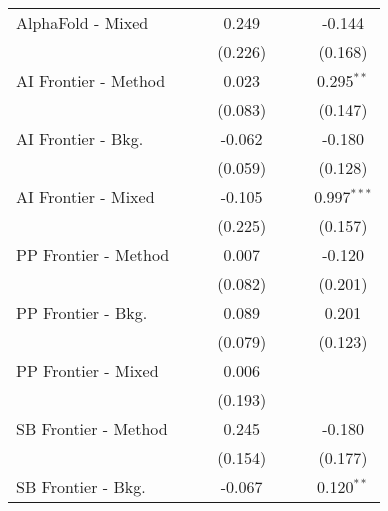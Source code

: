 \begin{tabular}{lcccccc}
   AlphaFold - Mixed    &               &              & 0.249          &               &              & -0.144\\   
                        &               &              & (0.226)        &               &              & (0.168)\\   
   AI Frontier - Method &               &              & 0.023          &               &              & 0.295$^{**}$\\   
                        &               &              & (0.083)        &               &              & (0.147)\\   
   AI Frontier - Bkg.   &               &              & -0.062         &               &              & -0.180\\   
                        &               &              & (0.059)        &               &              & (0.128)\\   
   AI Frontier - Mixed  &               &              & -0.105         &               &              & 0.997$^{***}$\\   
                        &               &              & (0.225)        &               &              & (0.157)\\   
   PP Frontier - Method &               &              & 0.007          &               &              & -0.120\\   
                        &               &              & (0.082)        &               &              & (0.201)\\   
   PP Frontier - Bkg.   &               &              & 0.089          &               &              & 0.201\\   
                        &               &              & (0.079)        &               &              & (0.123)\\   
   PP Frontier - Mixed  &               &              & 0.006          &               &              &   \\   
                        &               &              & (0.193)        &               &              &   \\   
   SB Frontier - Method &               &              & 0.245          &               &              & -0.180\\   
                        &               &              & (0.154)        &               &              & (0.177)\\   
   SB Frontier - Bkg.   &               &              & -0.067         &               &              & 0.120$^{**}$\\   

\end{tabular}
